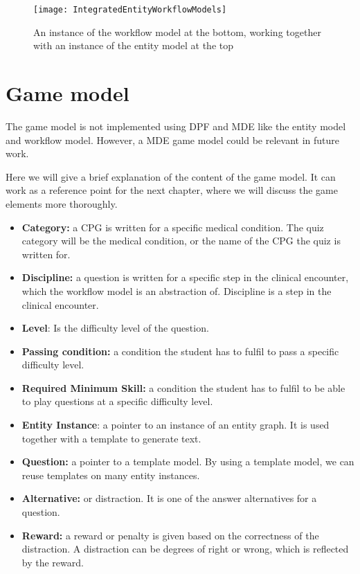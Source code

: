 \begin{figure}[h!]
	\texttt{[image: IntegratedEntityWorkflowModels]}
		\caption {An instance of the workflow model at the bottom, working together with an instance of the entity model at the top}
		\label{fig:IntegratedEntityWorkflowModels}
\end{figure}


\section{Game model}
The game model is not implemented using DPF and MDE like the entity model and workflow model. However, a MDE game model could be relevant in future work.

Here we will give a brief explanation of the content of the game model. It can work as a reference point for the next chapter, where we will discuss the game elements more thoroughly.
\begin{itemize}
	\item \textbf{Category:} a CPG is written for a specific medical condition. The quiz category will be the medical condition, or the name of the CPG the quiz is written for.
	\item \textbf{Discipline:} a question is written for a specific step in the clinical encounter, which the workflow model is an abstraction of. Discipline is a step in the clinical encounter.
	\item \textbf{Level}: Is the difficulty level of the question.
	\item \textbf{Passing condition:} a condition the student has to fulfil to pass a specific  difficulty level.
	\item \textbf{Required Minimum Skill:} a condition the student has to fulfil to be able to play questions at a specific difficulty level.
	\item\textbf{Entity Instance}: a pointer to an instance of an entity graph. It is used together with a template to generate text.
	\item \textbf{Question:} a pointer to a template model. By using a template model, we can reuse templates on many entity instances.
	\item \textbf{Alternative:} or distraction. It is one of the answer alternatives for a question. 
	\item \textbf{Reward:} a reward or penalty is given based on the correctness of the distraction. A distraction can be degrees of right or wrong, which is reflected by the reward.	
\end{itemize} 

